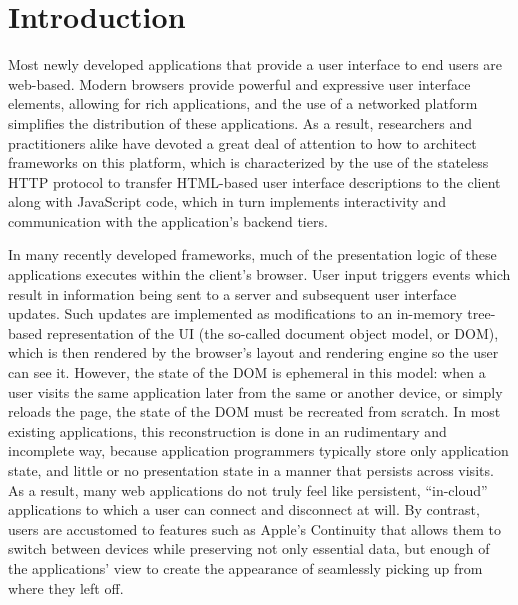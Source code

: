 %
%
\section{Introduction}
\label{sec:intro}

Most newly developed applications that provide a user interface to end users 
are web-based.  Modern browsers provide powerful and expressive user interface 
elements, allowing for rich applications, and the use of a networked
platform simplifies the distribution of these applications.  As a result,
researchers and practitioners alike have devoted a great deal of attention to
how to architect frameworks on this platform, which is characterized by the
use of the stateless HTTP protocol to transfer HTML-based user interface 
descriptions to the client along with JavaScript code, which in turn 
implements interactivity and communication with the application's backend tiers.

In many recently developed frameworks, much of the presentation logic of these applications
executes within the client's browser.  User input triggers events
which result in information being sent to a server and subsequent user interface updates.
Such updates are implemented as modifications to an in-memory tree-based
representation of the UI (the so-called document object model, or DOM), which
is then rendered by the browser's layout and rendering engine so the user can see it.
However, the state of the DOM is ephemeral in this model: when a user visits 
the same application later from the same or another device, or simply reloads the page, the state of the
DOM must be recreated from scratch.  In most existing applications, this 
reconstruction is done in an rudimentary and incomplete way, because
application programmers typically store only application state, and little 
or no presentation state in a manner that persists across visits.
As a result, many web applications do not truly feel like persistent,
``in-cloud'' applications to which a user can connect and disconnect at will.
By contrast, users are accustomed to features such as Apple's Continuity\cite{apple-continuity}
that allows them to switch between devices while preserving not only 
essential data, but enough of the applications' view to create the appearance
of seamlessly picking up from where they left off.

